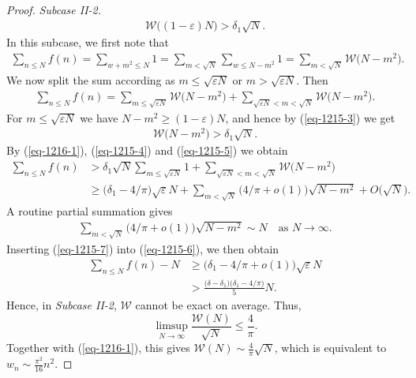\documentclass[12pt,a4paper,reqno]{amsart}
\numberwithin{equation}{section}
\theoremstyle{plain}
\theoremstyle{definition}
\begin{document}
\begin{proof}
{\it Subcase II-2.}  
\begin{align}\label{eq-1215-3}
\mathcal{W}\Big((1-\varepsilon)N\Big)>\delta_1 \sqrt{N}.
\end{align} 
In this subcase, we first note that
\begin{align*}
\sum_{n\le N}f(n)=\sum_{w+m^2\le N}1=\sum_{m<\sqrt{N}}\sum_{w\le N-m^2}1=\sum_{m<\sqrt{N}}\mathcal{W}\big(N-m^2\big).
\end{align*} 
We now split the sum according as $m\le \sqrt{\varepsilon N}$ or $m>\sqrt{\varepsilon N}$. Then
\begin{align}\label{eq-1215-4}
\sum_{n\le N}f(n)=\sum_{m\le \sqrt{\varepsilon N}}\mathcal{W}\big(N-m^2\big)+\sum_{\sqrt{\varepsilon N}< m<\sqrt{N}}\mathcal{W}\big(N-m^2\big).
\end{align} 
For $m\le \sqrt{\varepsilon N}$ we have $N-m^2\ge (1-\varepsilon)N$, and hence by (\ref{eq-1215-3}) we get
\begin{align}\label{eq-1215-5}
\mathcal{W}\big(N-m^2\big)>\delta_1 \sqrt{N}.
\end{align}
By (\ref{eq-1216-1}), (\ref{eq-1215-4}) and (\ref{eq-1215-5}) we obtain 
\begin{align}\label{eq-1215-6}
\sum_{n\le N}f(n)&>\delta_1 \sqrt{N}\sum_{m\le \sqrt{\varepsilon N}}1+\sum_{\sqrt{\varepsilon N}< m<\sqrt{N}}\mathcal{W}\big(N-m^2\big)\nonumber\\
&\ge \big(\delta_1-4/\pi\big) \sqrt{\varepsilon}N +\sum_{m<\sqrt{N}}\Big(4/\pi+o(1)\Big)\sqrt{N-m^2}+O\big(\sqrt{N}\big).
\end{align}
A routine partial summation gives
\begin{align}\label{eq-1215-7}
\sum_{m<\sqrt{N}}\Big(4/\pi+o(1)\Big)\sqrt{N-m^2}\sim N \quad \text{as }N\rightarrow\infty.
\end{align}
Inserting (\ref{eq-1215-7}) into (\ref{eq-1215-6}), we then obtain
\begin{align*}
\sum_{n\le N}f(n)-N&\ge \Big(\delta_1-4/\pi+o(1)\Big) \sqrt{\varepsilon}N\\
&> \frac{\big(\delta-\delta_1\big)\big(\delta_1-4/\pi\big)}{5}N.
\end{align*} 
Hence, in {\it Subcase II-2}, $\mathcal{W}$ cannot be exact on average.
Thus,
\[
 \limsup_{N\to\infty}\frac{\mathcal{W}(N)}{\sqrt N}\le \frac{4}{\pi}.
\]
Together with (\ref{eq-1216-1}), this gives $\mathcal{W}(N)\sim \frac{4}{\pi}\sqrt N$, which is equivalent to $w_n\sim \frac{\pi^2}{16}n^2$.
\end{proof}
\end{document}

